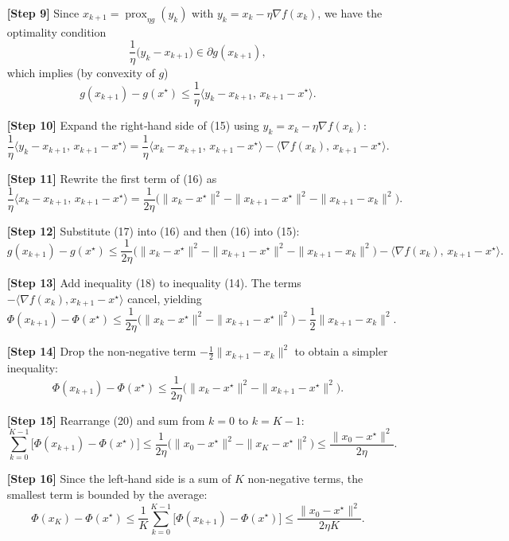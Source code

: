 \documentclass{article}
\newcommand{\prox}{\operatorname{prox}}
\begin{document}
\begin{enumerate}
\item[\textbf{[Step 9]}]  Since $x_{k+1}= \prox_{\eta g}(y_{k})$ with $y_{k}=x_{k}-\eta\nabla f(x_{k})$, we have the optimality condition  
\[
\frac{1}{\eta}\bigl(y_{k}-x_{k+1}\bigr)\in\partial g(x_{k+1}),
\]
which implies (by convexity of $g$)
\[
g(x_{k+1})-g(x^{\star})\le \frac{1}{\eta}\langle y_{k}-x_{k+1},\,x_{k+1}-x^{\star}\rangle .
\tag{15}
\]

\item[\textbf{[Step 10]}]  Expand the right‑hand side of (15) using $y_{k}=x_{k}-\eta\nabla f(x_{k})$:
\[
\frac{1}{\eta}\langle y_{k}-x_{k+1},\,x_{k+1}-x^{\star}\rangle
= \frac{1}{\eta}\langle x_{k}-x_{k+1},\,x_{k+1}-x^{\star}\rangle
-\langle\nabla f(x_{k}),\,x_{k+1}-x^{\star}\rangle .
\tag{16}
\]

\item[\textbf{[Step 11]}]  Rewrite the first term of (16) as
\[
\frac{1}{\eta}\langle x_{k}-x_{k+1},\,x_{k+1}-x^{\star}\rangle
= \frac{1}{2\eta}\bigl(\|x_{k}-x^{\star}\|^{2}
-\|x_{k+1}-x^{\star}\|^{2}
-\|x_{k+1}-x_{k}\|^{2}\bigr).
\tag{17}
\]

\item[\textbf{[Step 12]}]  Substitute (17) into (16) and then (16) into (15):
\[
g(x_{k+1})-g(x^{\star})
\le
\frac{1}{2\eta}\bigl(\|x_{k}-x^{\star}\|^{2}
-\|x_{k+1}-x^{\star}\|^{2}
-\|x_{k+1}-x_{k}\|^{2}\bigr)
-\langle\nabla f(x_{k}),\,x_{k+1}-x^{\star}\rangle .
\tag{18}
\]

\item[\textbf{[Step 13]}]  Add inequality (18) to inequality (14).  The terms $-\langle\nabla f(x_{k}),x_{k+1}-x^{\star}\rangle$ cancel, yielding
\[
\Phi(x_{k+1})- \Phi(x^{\star})
\le
\frac{1}{2\eta}\bigl(\|x_{k}-x^{\star}\|^{2}
-\|x_{k+1}-x^{\star}\|^{2}\bigr)
-\frac{1}{2}\|x_{k+1}-x_{k}\|^{2}.
\tag{19}
\]

\item[\textbf{[Step 14]}]  Drop the non‑negative term $-\frac12\|x_{k+1}-x_{k}\|^{2}$ to obtain a simpler inequality:
\[
\Phi(x_{k+1})- \Phi(x^{\star})
\le
\frac{1}{2\eta}\bigl(\|x_{k}-x^{\star}\|^{2}
-\|x_{k+1}-x^{\star}\|^{2}\bigr).
\tag{20}
\]

\item[\textbf{[Step 15]}]  Rearrange (20) and sum from $k=0$ to $k=K-1$:
\[
\sum_{k=0}^{K-1}\bigl[\Phi(x_{k+1})- \Phi(x^{\star})\bigr]
\le
\frac{1}{2\eta}\bigl(\|x_{0}-x^{\star}\|^{2}
-\|x_{K}-x^{\star}\|^{2}\bigr)
\le\frac{\|x_{0}-x^{\star}\|^{2}}{2\eta}.
\tag{21}
\]

\item[\textbf{[Step 16]}]  Since the left‑hand side is a sum of $K$ non‑negative terms, the smallest term is bounded by the average:
\[
\Phi(x_{K})- \Phi(x^{\star})
\le
\frac{1}{K}\sum_{k=0}^{K-1}\bigl[\Phi(x_{k+1})- \Phi(x^{\star})\bigr]
\le\frac{\|x_{0}-x^{\star}\|^{2}}{2\eta K}.
\tag{22}
\]


\end{enumerate}
\end{document}
